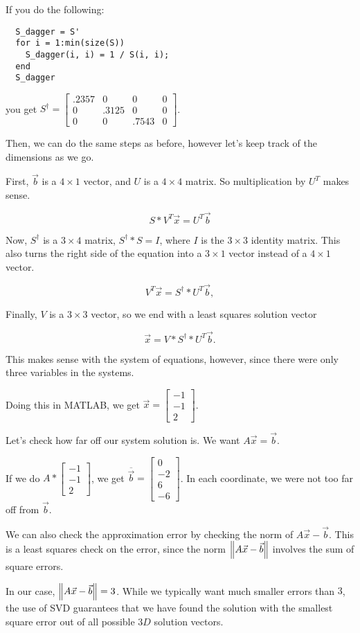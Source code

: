 \documentclass{ximera}
\begin{document}
\begin{solution}
If you do the following: 

\begin{verbatim}
  S_dagger = S' 
  for i = 1:min(size(S))
    S_dagger(i, i) = 1 / S(i, i);
  end
  S_dagger
\end{verbatim}

you get $S^\dagger=\begin{bmatrix}
  .2357 & 0      & 0      & 0 \\
  0      & .3125 & 0      & 0 \\
  0      & 0      & .7543 & 0
  \end{bmatrix}$. 

  Then, we can do the same steps as before, however let's keep track of the dimensions as we go. 

  First, $\vec{b}$ is a $4\times 1$ vector, and $U$ is a $4\times4$ matrix. So multiplication by $U^T$ makes sense.

$$S*V^T\vec{x}=U^T\vec{b}$$

Now, $S^\dagger$ is a $3\times 4$ matrix, $S^\dagger*S=I$, where $I$ is the $3\times 3$ identity matrix. This also turns the right side of the equation into a $3\times 1$ vector instead of a $4\times 1$ vector. 

$$V^T\vec{x}=S^\dagger*U^T\vec{b},$$

Finally, $V$ is a $3\times 3$ vector, so we end with a least squares solution vector

$$\vec{x}=V*S^\dagger*U^T\vec{b}.$$

This makes sense with the system of equations, however, since there were only three variables in the systems. 

Doing this in MATLAB, we get $\vec{x}=\begin{bmatrix}
  -1\\-1\\2
\end{bmatrix}$. 

Let's check how far off our system solution is. We want $A\vec{x}=\vec{b}$. 

If we do $A*\begin{bmatrix}
  -1\\-1\\2
\end{bmatrix}$, we get $\overline{\vec{b}}=\begin{bmatrix}
  0\\-2\\6\\-6
\end{bmatrix}$. In each coordinate, we were not too far off from $\vec{b}$. 

We can also check the approximation error by checking the norm of $A\vec{x}-\vec{b}$. This is a least squares check on the error, since the norm $\left\|A\vec{x}-\vec{b}\right\|$ involves the sum of square errors. 

In our case, $\left\|A\vec{x}-\vec{b}\right\|=3$. While we typically want much smaller errors than $3$, the use of SVD guarantees that we have found the solution with the smallest square error out of all possible $3D$ solution vectors. 

\end{solution}
\end{document}
